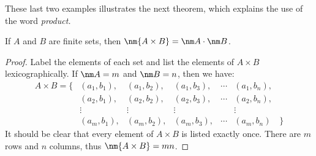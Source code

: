 

\noindent These last two examples illustrates the next theorem, which explains the use of the word \emph{product.}

\begin{thm}
If $A$ and $B$ are finite sets, then $\nm{A\times B}=\nm A\cdot\nm B$.
\end{thm}

\begin{proof}
Label the elements of each set and list the elements of $A\times B$ lexicographically. If $\nm A=m$ and $\nm B=n$, then we have:
\[\begin{array}{rccccccl}
A\times B=\big\{&(a_1,b_1),&(a_1,b_2),&(a_1,b_3),&\cdots&(a_1,b_n),&\\
&(a_2,b_1),&(a_2,b_2),&(a_2,b_3),&\cdots&(a_2,b_n),&\\
&\vdots&\vdots&\vdots&&\vdots&\\
&(a_m,b_1),&(a_m,b_2),&(a_m,b_3),&\cdots&(a_m,b_n)&\big\}
\end{array}\]
It should be clear that every element of $A\times B$ is listed exactly once. There are $m$ rows and $n$ columns, thus $\nm{A\times B}=mn$.
\end{proof}

